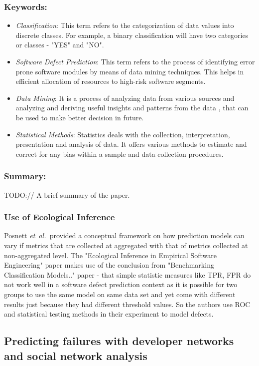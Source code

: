 \documentclass{sig-alternate-05-2015}
\newcommand{\etal}{\mbox{\emph{et al.\ }}}
\begin{document}
\subsubsection{Keywords:}
\begin{itemize}
\item \emph{Classification}: This term refers to the categorization of data values into discrete classes. For example, a binary classification will have two categories or classes - "YES" and "NO".
\item \emph{Software Defect Prediction}: This term refers to the process of identifying error prone software modules by means of data mining techniques. This helps in efficient allocation of resources to high-risk software segments.
\item \emph{Data Mining}: It is a process of analyzing data from various sources and analyzing and deriving useful insights and patterns from the data , that can be used to make better decision in future.
\item \emph{Statistical Methods}: Statistics deals with the collection, interpretation, presentation and analysis of data. It offers various methods to estimate and correct for any bias within a sample and data collection procedures.
\end{itemize} 

\subsubsection{Summary:}
TODO:// A brief summary of the paper.

\subsubsection{Use of Ecological Inference}
Posnett \etal provided a conceptual framework on how prediction models can vary if metrics that are collected at aggregated with that of metrics collected at non-aggregated level. The "Ecological Inference in Empirical Software Engineering" paper makes use of the conclusion from "Benchmarking Classification Models.." paper - that simple statistic measures like TPR, FPR do not work well in a software defect prediction context as it is possible for two groups to use the same model on same data set and yet come with different results just because they had different threshold values. So the authors use ROC and statistical testing methods in their experiment to model defects.

\subsection{Predicting failures with developer networks and social network analysis \cite{Meneely:2008}}
\end{document}
